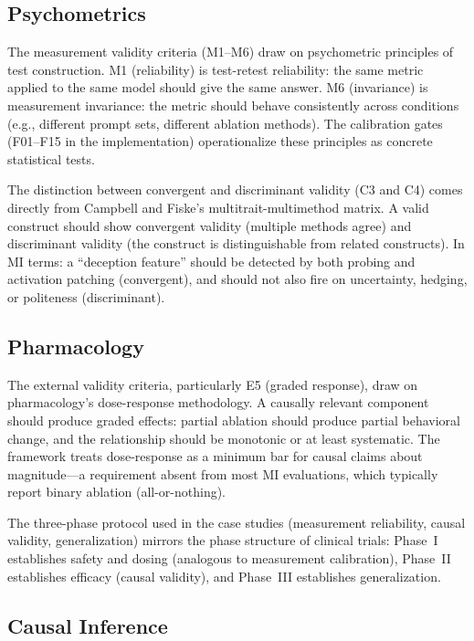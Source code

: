 \documentclass[10pt]{article}
\newcommand{\eg}{e.g.}
\begin{document}
\subsection{Psychometrics}
\label{sec:psychometrics}

The measurement validity criteria (M1--M6) draw on psychometric principles of test construction. M1 (reliability) is test-retest reliability: the same metric applied to the same model should give the same answer. M6 (invariance) is measurement invariance: the metric should behave consistently across conditions (\eg, different prompt sets, different ablation methods). The calibration gates (F01--F15 in the implementation) operationalize these principles as concrete statistical tests.

The distinction between convergent and discriminant validity (C3 and C4) comes directly from Campbell and Fiske's multitrait-multimethod matrix. A valid construct should show convergent validity (multiple methods agree) and discriminant validity (the construct is distinguishable from related constructs). In MI terms: a ``deception feature'' should be detected by both probing and activation patching (convergent), and should not also fire on uncertainty, hedging, or politeness (discriminant).

\subsection{Pharmacology}
\label{sec:pharma}

The external validity criteria, particularly E5 (graded response), draw on pharmacology's dose-response methodology. A causally relevant component should produce graded effects: partial ablation should produce partial behavioral change, and the relationship should be monotonic or at least systematic. The framework treats dose-response as a minimum bar for causal claims about magnitude---a requirement absent from most MI evaluations, which typically report binary ablation (all-or-nothing).

The three-phase protocol used in the case studies (measurement reliability, causal validity, generalization) mirrors the phase structure of clinical trials: Phase~I establishes safety and dosing (analogous to measurement calibration), Phase~II establishes efficacy (causal validity), and Phase~III establishes generalization.

\subsection{Causal Inference}
\label{sec:causal}
\end{document}
